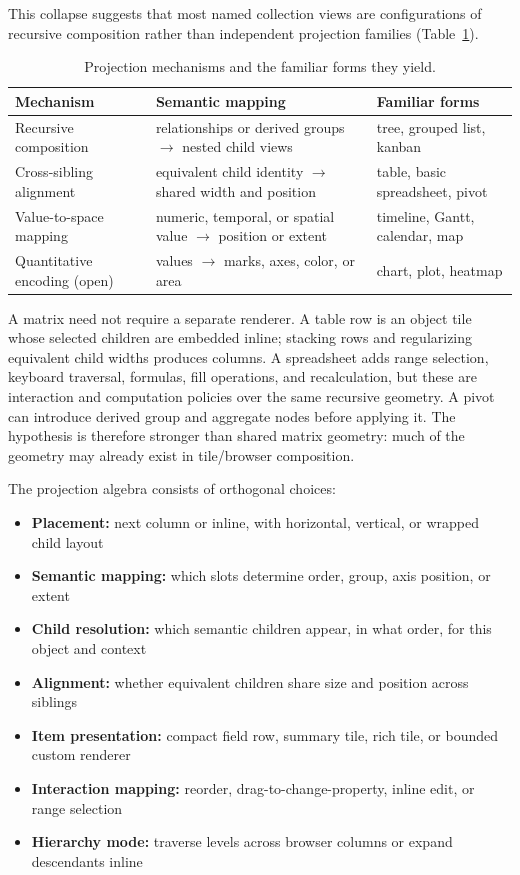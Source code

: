 \documentclass[sigplan,review,anonymous,10pt]{acmart}
\begin{document}
This collapse suggests that most named collection views are configurations of recursive composition rather than independent projection families (Table~\ref{tab:mechanisms}).

\begin{table}[t]
\centering
\begin{tabular}{p{} p{} p{}}
\hline
Mechanism & Semantic mapping & Familiar forms \\
\hline
Recursive composition & relationships or derived groups $\rightarrow$ nested child views & tree, grouped list, kanban \\
Cross-sibling alignment & equivalent child identity $\rightarrow$ shared width and position & table, basic spreadsheet, pivot \\
Value-to-space mapping & numeric, temporal, or spatial value $\rightarrow$ position or extent & timeline, Gantt, calendar, map \\
Quantitative encoding (open) & values $\rightarrow$ marks, axes, color, or area & chart, plot, heatmap \\
\hline
\end{tabular}
\caption{Projection mechanisms and the familiar forms they yield.}
\label{tab:mechanisms}
\end{table}

A matrix need not require a separate renderer. A table row is an object tile whose selected children are embedded inline; stacking rows and regularizing equivalent child widths produces columns. A spreadsheet adds range selection, keyboard traversal, formulas, fill operations, and recalculation, but these are interaction and computation policies over the same recursive geometry. A pivot can introduce derived group and aggregate nodes before applying it. The hypothesis is therefore stronger than shared matrix geometry: much of the geometry may already exist in tile/browser composition.

The projection algebra consists of orthogonal choices:

\begin{itemize}
\item \textbf{Placement:} next column or inline, with horizontal, vertical, or wrapped child layout
\item \textbf{Semantic mapping:} which slots determine order, group, axis position, or extent
\item \textbf{Child resolution:} which semantic children appear, in what order, for this object and context
\item \textbf{Alignment:} whether equivalent children share size and position across siblings
\item \textbf{Item presentation:} compact field row, summary tile, rich tile, or bounded custom renderer
\item \textbf{Interaction mapping:} reorder, drag-to-change-property, inline edit, or range selection
\item \textbf{Hierarchy mode:} traverse levels across browser columns or expand descendants inline
\end{itemize}
\end{document}

